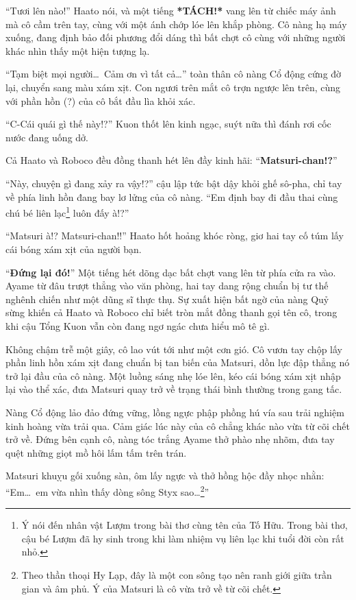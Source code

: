 \documentclass[../main.tex]{subfiles}
\begin{document}
``Tươi lên nào!'' Haato nói, và một tiếng \textbf{*TÁCH!*} vang lên từ chiếc máy ảnh mà cô cầm trên tay, cùng với một ánh chớp lóe lên khắp phòng. Cô nàng hạ máy xuống, đang định bảo đối phương đổi dáng thì bất chợt cô cùng với những người khác nhìn thấy một hiện tượng lạ.


``Tạm biệt mọi người\dots\ Cảm ơn vì tất cả\dots'' toàn thân cô nàng Cổ động cứng đờ lại, chuyển sang màu xám xịt. Con ngươi trên mắt cô trợn ngược lên trên, cùng với phần hồn (?) của cô bắt đầu lìa khỏi xác.

``C-Cái quái gì thế này!?'' Kuon thốt lên kinh ngạc, suýt nữa thì đánh rơi cốc nước đang uống dở.

Cả Haato và Roboco đều đồng thanh hét lên đầy kinh hãi: ``\textbf{Matsuri-chan!?}''

``Này, chuyện gì đang xảy ra vậy!?'' cậu lập tức bật dậy khỏi ghế sô-pha, chỉ tay về phía linh hồn đang bay lơ lửng của cô nàng. ``Em định bay đi đầu thai cùng chú bé liên lạc\footnote{Ý nói đến nhân vật Lượm trong bài thơ cùng tên của Tố Hữu. Trong bài thơ, cậu bé Lượm đã hy sinh trong khi làm nhiệm vụ liên lạc khi tuổi đời còn rất nhỏ.} luôn đấy à!?''

``Matsuri à!? Matsuri-chan!!'' Haato hốt hoảng khóc ròng, giơ hai tay cố túm lấy cái bóng xám xịt của người bạn.

``\textbf{Đứng lại đó!}'' Một tiếng hét dõng dạc bất chợt vang lên từ phía cửa ra vào. Ayame từ đâu trượt thẳng vào văn phòng, hai tay dang rộng chuẩn bị tư thế nghênh chiến như một dũng sĩ thực thụ. Sự xuất hiện bất ngờ của nàng Quỷ sừng khiến cả Haato và Roboco chỉ biết tròn mắt đồng thanh gọi tên cô, trong khi cậu Tổng Kuon vẫn còn đang ngơ ngác chưa hiểu mô tê gì.

Không chậm trễ một giây, cô lao vút tới như một cơn gió. Cô vươn tay chộp lấy phần linh hồn xám xịt đang chuẩn bị tan biến của Matsuri, dồn lực đập thẳng nó trở lại đầu của cô nàng. Một luồng sáng nhẹ lóe lên, kéo cái bóng xám xịt nhập lại vào thể xác, đưa Matsuri quay trở về trạng thái bình thường trong gang tấc.

Nàng Cổ động lảo đảo đứng vững, lồng ngực phập phồng hú vía sau trải nghiệm kinh hoàng vừa trải qua. Cảm giác lúc này của cô chẳng khác nào vừa từ cõi chết trở về. Đứng bên cạnh cô, nàng tóc trắng Ayame thở phào nhẹ nhõm, đưa tay quệt những giọt mồ hôi lấm tấm trên trán.

Matsuri khuỵu gối xuống sàn, ôm lấy ngực và thở hồng hộc đầy nhọc nhằn: ``Em\dots\ em vừa nhìn thấy dòng sông Styx sao\dots\footnote{Theo thần thoại Hy Lạp, đây là một con sông tạo nên ranh giới giữa trần gian và âm phủ. Ý của Matsuri là cô vừa trở về từ cõi chết.}''
\end{document}
